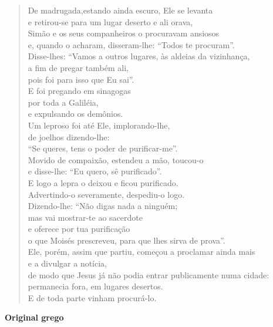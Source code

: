 \begin{verse}
	\large
	De madrugada,estando ainda escuro, Ele se levanta\\
	e retirou-se para um lugar deserto e ali orava,\\
	Simão e os seus companheiros o procuravam ansiosos\\
	e, quando o acharam, disseram-lhe: “Todos te procuram”.\\
	Disse-lhes: ``Vamos a outros lugares, às aldeias da vizinhança,\\
	a fim de pregar também ali,\\
	pois foi para isso que Eu sai''.\\
	E foi pregando em  sinagogas\\
	por toda a Galiléia,\\
	e expulsando os demônios.\\
	Um leproso foi até Ele, implorando-lhe,\\
	de joelhos dizendo-lhe:\\
	``Se queres, tens o poder de purificar-me''.\\
	Movido de compaixão, estendeu a mão, toucou-o\\
	e disse-lhe: ``Eu quero, sê purificado''.\\
	E logo a lepra o deixou e ficou purificado.\\
	Advertindo-o severamente, despediu-o logo.\\
	Dizendo-lhe: ``Não digas nada a ninguém;\\
	mas vai mostrar-te ao sacerdote\\
	e oferece por tua purificação\\
	o que Moisés prescreveu, para que lhes sirva de prova''.\\
	Ele, porém, assim que partiu, começou a proclamar ainda mais\\
	e a divulgar a notícia,\\
	de modo que Jesus já não podia entrar publicamente numa cidade:\\
	permanecia fora, em lugares desertos.\\
	E de toda parte vinham procurá-lo.
\end{verse}


\clearpage{}
\textbf{Original grego}

